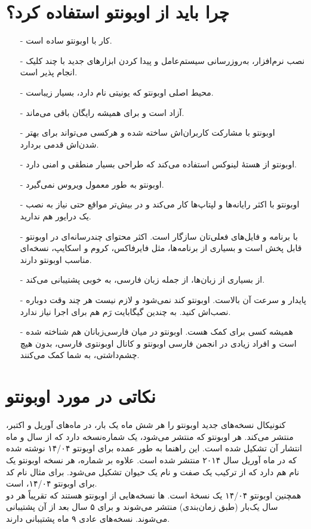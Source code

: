 \section{چرا باید از اوبونتو استفاده کرد؟}
\begin{itemize}
\item[-] کار با اوبونتو ساده است.
\item[-] نصب نرم‌افزار، به‌روزرسانی سیستم‌عامل و پیدا کردن ابزارهای جدید با چند کلیک انجام پذیر است.
\item[-] محیط اصلی اوبونتو که یونیتی نام دارد، بسیار زیباست.
\item[-] آزاد است و برای همیشه رایگان باقی می‌ماند.
\item[-] اوبونتو با مشارکت کاربران‌اش ساخته شده و هرکسی می‌تواند برای بهتر شدن‌اش قدمی بردارد.
\item[-] اوبونتو از هستهٔ لینوکس استفاده می‌کند که طراحی بسیار منطقی و امنی دارد.
\item[-] اوبونتو به طور معمول ویروس نمی‌گیرد.
\item[-] اوبونتو با اکثر رایانه‌ها و لپتاپ‌ها کار می‌کند و در بیش‌تر مواقع حتی نیاز به نصب یک درایور هم ندارید.
\item[-] با برنامه و فایل‌های فعلی‌تان سازگار است. اکثر محتوای چندرسانه‌ای در اوبونتو قابل پخش است و بسیاری از برنامه‌ها، مثل فایرفاکس، کروم و اسکایپ، نسخه‌ای مناسب اوبونتو دارند.
\item[-] از بسیاری از زبان‌ها، از جمله زبان فارسی، به خوبی پشتیبانی می‌کند.
\item[-] پایدار و سرعت آن بالاست. اوبونتو کند نمی‌شود و لازم نیست هر چند وقت دوباره نصب‌اش کنید. به چندین گیگابایت رَم هم برای اجرا نیاز ندارد.
\item[-] همیشه کسی برای کمک هست. اوبونتو در میان فارسی‌زبانان هم شناخته شده است و افراد زیادی در انجمن فارسی اوبونتو و کانال  اوبونتوی فارسی، بدون هیچ چشم‌داشتی، به شما کمک می‌کنند.

\end{itemize}

\section{نکاتی در مورد اوبونتو}
کنونیکال نسخه‌های جدید اوبونتو را هر شش ماه یک بار، در ماه‌های آوریل و اکتبر، منتشر می‌کند. هر اوبونتو که منتشر می‌شود، یک شماره‌نسخه دارد که از سال و ماه انتشار آن تشکیل شده است. این راهنما به طور عمده برای اوبونتو ۱۴/۰۴ نوشته شده که در ماه آوریل سال ۲۰۱۴ منتشر شده است.
علاوه بر شماره، هر نسخه اوبونتو یک نام هم دارد که از ترکیب یک صفت و نام یک حیوان تشکیل می‌شود. برای مثال نام کد برای اوبونتو ۱۴/۰۴،  است.\\ همچنین اوبونتو ۱۴/۰۴ یک نسخهٔ  است.  ها نسخه‌هایی از اوبونتو هستند که تقریباً هر دو سال یک‌بار (طبق زمان‌بندی) منتشر می‌شوند و برای ۵ سال بعد از آن پشتیبانی می‌شوند. نسخه‌های عادی ۹ ماه پشتیبانی دارند.\\
